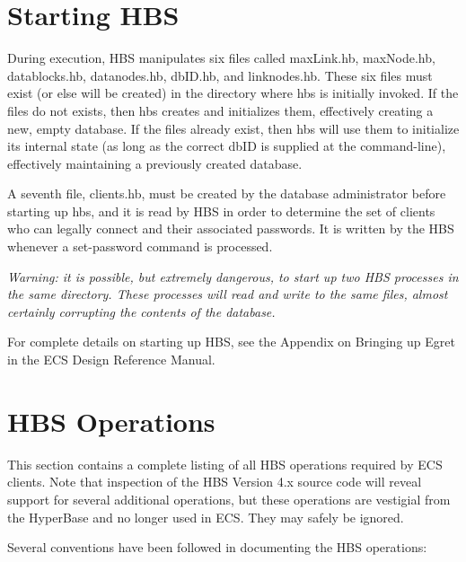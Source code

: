 \section{Starting HBS}

During execution, HBS manipulates six files called maxLink.hb, maxNode.hb, datablocks.hb,
datanodes.hb, dbID.hb, and linknodes.hb.  These six files must exist (or else
will be created) in the directory where hbs is initially invoked.  If the
files do not exists, then hbs creates and initializes them, effectively
creating a new, empty database.  If the files already exist, then hbs will
use them to initialize its internal state (as long as the correct dbID is
supplied at the command-line), effectively maintaining a previously created
database.

A seventh file, clients.hb, must be created by the database 
administrator before starting up hbs, and it is read by HBS 
in order to determine the set of clients who can legally 
connect and their associated passwords. It is written by the
HBS whenever a set-password command is processed.

{\em Warning: it is possible, but extremely dangerous, to start up two HBS
processes in the same directory.  These processes will read and write to
the same files, almost certainly corrupting the contents of the database.}

For complete details on starting up HBS, see the Appendix on Bringing
up Egret in the ECS Design Reference Manual.


\section{HBS Operations}
\label{sec:operations}

This section contains a complete listing of all HBS operations required by
ECS clients.  Note that inspection of the HBS Version 4.x source code will
reveal support for several additional operations, but these operations are
vestigial from the HyperBase and no longer used in ECS.  They may safely be
ignored. 

Several conventions have been followed in documenting the HBS operations:


